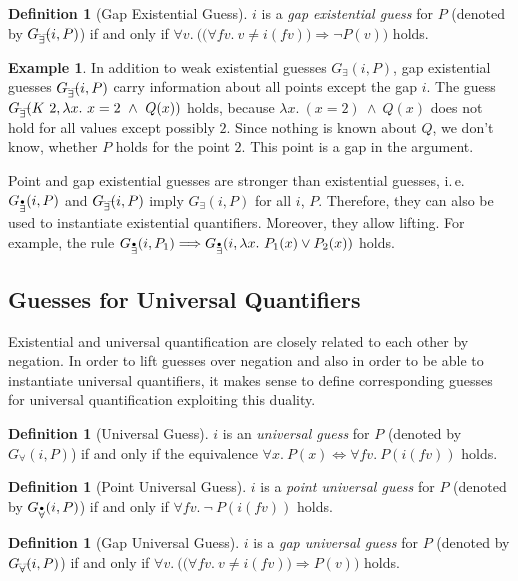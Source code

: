 \documentclass[a4paper,12pt,DIV=12,oneside]{scrbook}
\newcommand{\fv}{\textit{fv}}
\theoremstyle{definition}
\newtheorem{definition}[lemma]{Definition}
\newtheorem{example}[lemma]{Example}
\theoremstyle{remark}
\newcommand{\GE}{\ensuremath{G_\exists}}
\newcommand{\GEP}{\ensuremath{G_{\accentset{\bullet}{\exists}}}}
\newcommand{\GEG}{\ensuremath{G_{\accentset{\_\,\_}{\exists}}}}
\newcommand{\GU}{\ensuremath{G_\forall}}
\newcommand{\GUP}{\ensuremath{G_{\accentset{\bullet}{\forall}}}}
\newcommand{\GUG}{\ensuremath{G_{\accentset{\_\,\_}{\forall}}}}
\begin{document}
\begin{definition}[Gap Existential Guess]
  $i$ is a \emph{gap existential guess} for $P$ (denoted by $\GEG(i, P)$)
  if and only if $\forall v.\ \big(\big(\forall \fv.\ v \neq
  i(\fv)\big) \Longrightarrow \neg P(v)\big)$ holds.
\end{definition}

\begin{example}
In addition to weak existential guesses $\GE(i,P)$, gap existential
guesses $\GEG(i,P)$ carry information about all points except the gap $i$.
The guess $\GEG(K\ 2, \lambda x.\ x = 2\ \wedge\ Q(x))$ holds, because $\lambda x.\ (x = 2)\ \wedge\ Q(x)$ 
does not hold for all values except possibly $2$. Since nothing is known about $Q$, we don't know,
whether $P$ holds for the point $2$. This point is a gap in the argument.
\end{example}

\noindent
Point and gap existential guesses are stronger than existential
guesses, i.\,e.\ $\GEP(i, P)$ and $\GEG(i, P)$ imply $\GE(i, P)$ for
all $i$, $P$. Therefore, they can also be used to instantiate
existential quantifiers.  Moreover, they allow lifting. For example,
the rule $\GEP(i, P_1) \Longrightarrow \GEP(i, \lambda x.\ P_1(x) \vee
P_2(x))$ holds.

\subsection{Guesses for Universal Quantifiers}

Existential and universal quantification are closely related to each
other by negation. In order to lift guesses over negation and also in
order to be able to instantiate universal quantifiers, it makes sense
to define corresponding guesses for universal quantification
exploiting this duality.

\begin{definition}[Universal Guess]
  $i$ is an \emph{universal guess} for $P$ (denoted by $\GU(i, P)$)
  if and only if the equivalence $\forall x.\ P(x) \Longleftrightarrow
  \forall \fv.\ P(i(\fv))$ holds.
\end{definition}

\begin{definition}[Point Universal Guess]
$i$ is a \emph{point universal guess} for $P$ (denoted by $\GUP(i, P)$) if and only if $\forall \fv.\ \neg\ P(i(\fv))$ holds.
\end{definition}

\begin{definition}[Gap Universal Guess]
  $i$ is a \emph{gap universal guess} for $P$ (denoted by $\GUG(i,
  P)$) if and only if $\forall v.\ \big(\big(\forall \fv.\ v \neq
  i(\fv)\big) \Longrightarrow P(v)\big)$ holds.
\end{definition}
\end{document}

